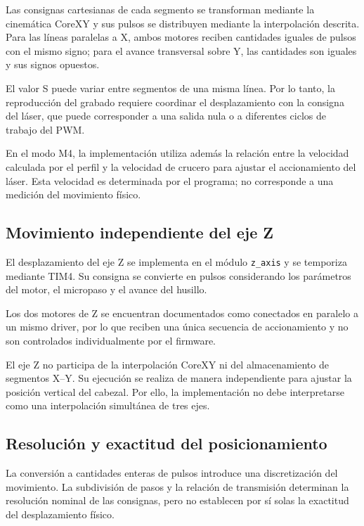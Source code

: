 \documentclass[blue,fullpaper]{ludusofficial}  %
\begin{document}
Las consignas cartesianas de cada segmento se
transforman mediante la cinemática CoreXY y sus
pulsos se distribuyen mediante la interpolación
descrita. Para las líneas paralelas a X,
ambos motores reciben cantidades iguales de pulsos
con el mismo signo; para el avance transversal
sobre Y, las cantidades son iguales y sus
signos opuestos.

El valor S puede variar entre segmentos de una
misma línea. Por lo tanto, la reproducción del
grabado requiere coordinar el desplazamiento
con la consigna del láser, que puede corresponder
a una salida nula o a diferentes ciclos de trabajo
del PWM.

En el modo M4, la implementación utiliza además
la relación entre la velocidad calculada por
el perfil y la velocidad de crucero para ajustar
el accionamiento del láser. Esta velocidad
es determinada por el programa; no corresponde
a una medición del movimiento físico.

\subsection{Movimiento independiente del eje Z}

El desplazamiento del eje Z se implementa
en el módulo \texttt{z\_axis} y se temporiza
mediante TIM4. Su consigna se convierte
en pulsos considerando los parámetros
del motor, el micropaso y el avance del husillo.

Los dos motores de Z se encuentran documentados
como conectados en paralelo a un mismo driver,
por lo que reciben una única secuencia
de accionamiento y no son controlados
individualmente por el firmware.

El eje Z no participa de la interpolación CoreXY
ni del almacenamiento de segmentos X--Y.
Su ejecución se realiza de manera independiente
para ajustar la posición vertical del cabezal.
Por ello, la implementación no debe interpretarse
como una interpolación simultánea de tres ejes.

\subsection{Resolución y exactitud del posicionamiento}

La conversión a cantidades enteras de pulsos
introduce una discretización del movimiento.
La subdivisión de pasos y la relación de transmisión
determinan la resolución nominal de las consignas,
pero no establecen por sí solas la exactitud
del desplazamiento físico.
\end{document}
